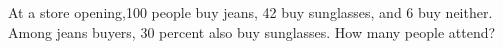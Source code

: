 At a store opening,100 people buy jeans, 42 buy sunglasses, and 6 buy neither. Among jeans buyers, 30 percent also buy sunglasses. How many people attend?
